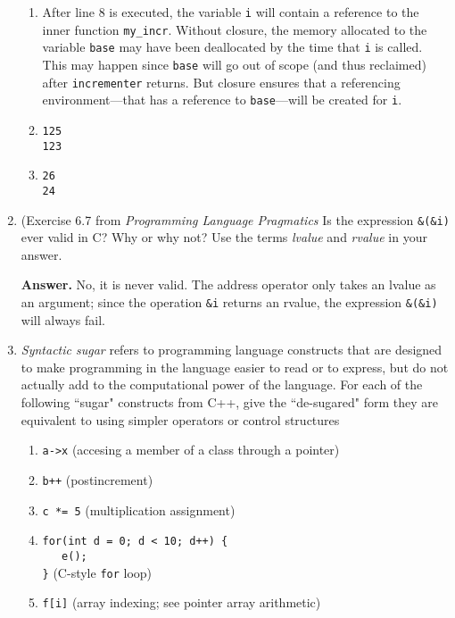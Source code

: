 \documentclass[9pt]{article}
\begin{document}
\begin{enumerate}
      \begin{enumerate}
         \item After line 8 is executed, the variable \verb|i| will contain a
               reference to the inner function \verb|my_incr|. Without closure,
               the memory allocated to the variable \verb|base| may have been
               deallocated by the time that \verb|i| is called. This may happen
               since \verb|base| will go out of scope (and thus reclaimed) after 
               \verb|incrementer| returns. But closure ensures that a
               referencing environment---that has a reference to
               \verb|base|---will be created for \verb|i|.
         \item \verb|125| \\
               \verb|123|
         \item \verb|26| \\
               \verb|24|
      \end{enumerate}
   \item (Exercise 6.7 from \textit{Programming Language Pragmatics} Is the
         expression \verb|&(&i)| ever valid in C? Why or why not? Use the terms
         \textit{lvalue} and \textit{rvalue} in your answer.

      \textbf{Answer.} No, it is never valid. The address operator only takes an
      lvalue as an argument; since the operation \verb|&i| returns an rvalue,
      the expression \verb|&(&i)| will always fail.
   \item \textit{Syntactic sugar} refers to programming language constructs that
         are designed to make programming in the language easier to read or to
         express, but do not actually add to the computational power of the
         language. For each of the following ``sugar" constructs from C++, give
         the ``de-sugared" form they are equivalent to using simpler operators
         or control structures
         \begin{enumerate}
            \item \verb|a->x| (accesing a member of a class through a pointer)
            \item \verb|b++| (postincrement)
            \item \verb|c *= 5| (multiplication assignment)
            \item \verb|for(int d = 0; d < 10; d++) {| \\
                  \verb|   e();| \\
                  \verb|}| (C-style \verb|for| loop)
            \item \verb|f[i]| (array indexing; see pointer array arithmetic)
         \end{enumerate}


\end{enumerate}
\end{document}
